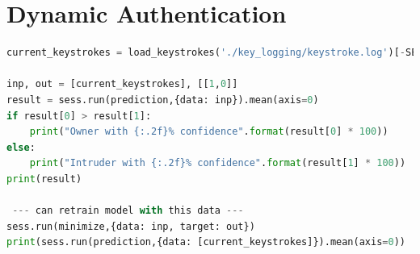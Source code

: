 \documentclass[fancychapters]{report}
\begin{document}
\section{Dynamic Authentication}
\begin{lstlisting}[language=Python]
current_keystrokes = load_keystrokes('./key_logging/keystroke.log')[-SEQ_LENGTH:]

inp, out = [current_keystrokes], [[1,0]]
result = sess.run(prediction,{data: inp}).mean(axis=0)
if result[0] > result[1]:
    print("Owner with {:.2f}% confidence".format(result[0] * 100))
else:    
    print("Intruder with {:.2f}% confidence".format(result[1] * 100))
print(result)

 --- can retrain model with this data --- 
sess.run(minimize,{data: inp, target: out})
print(sess.run(prediction,{data: [current_keystrokes]}).mean(axis=0))
\end{lstlisting}
\end{document}
